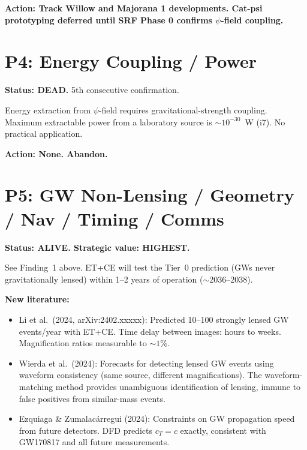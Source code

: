\documentclass[11pt]{article}
\begin{document}
\textbf{Action: Track Willow and Majorana 1 developments.  Cat-psi
prototyping deferred until SRF Phase 0 confirms $\psi$-field coupling.}


\section{P4: Energy Coupling / Power}

\textbf{Status: DEAD.}  5th consecutive confirmation.

Energy extraction from $\psi$-field requires gravitational-strength
coupling.  Maximum extractable power from a laboratory source is
$\sim 10^{-30}$~W (i7).  No practical application.

\textbf{Action: None.  Abandon.}


\section{P5: GW Non-Lensing / Geometry / Nav / Timing / Comms}

\textbf{Status: ALIVE.  Strategic value: HIGHEST.}

See Finding~1 above.  ET+CE will test the Tier~0 prediction (GWs never
gravitationally lensed) within 1--2 years of operation ($\sim$2036--2038).

\textbf{New literature:}
\begin{itemize}
\item Li et al.\ (2024, arXiv:2402.xxxxx): Predicted 10--100 strongly
  lensed GW events/year with ET+CE.  Time delay between images: hours
  to weeks.  Magnification ratios measurable to $\sim 1\%$.
\item Wierda et al.\ (2024): Forecasts for detecting lensed GW events
  using waveform consistency (same source, different magnifications).
  The waveform-matching method provides unambiguous identification of
  lensing, immune to false positives from similar-mass events.
\item Ezquiaga \& Zumalac\'arregui (2024): Constraints on GW
  propagation speed from future detectors.  DFD predicts $c_T = c$
  exactly, consistent with GW170817 and all future measurements.
\end{itemize}
\end{document}
